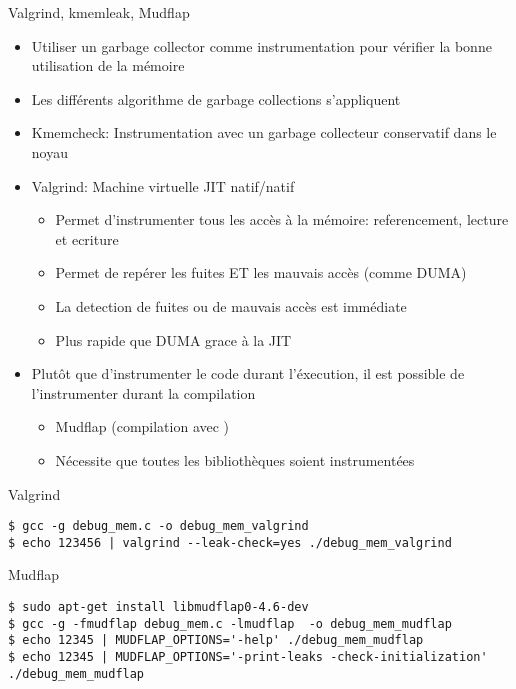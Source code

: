 \begin{frame}[fragile=singleslide]{Valgrind, kmemleak, Mudflap}
  \begin{itemize}
  \item  Utiliser  un  garbage  collector comme  instrumentation  pour
    vérifier la bonne utilisation de la mémoire
  \item Les différents algorithme de garbage collections s'appliquent
  \item   Kmemcheck:  Instrumentation   avec  un   garbage  collecteur
    conservatif dans le noyau
  \item Valgrind: Machine virtuelle JIT natif/natif
    \begin{itemize}
    \item  Permet   d'instrumenter  tous  les  accès   à  la  mémoire:
      referencement, lecture et ecriture
    \item Permet  de repérer  les fuites ET  les mauvais  accès (comme
      DUMA)
    \item La detection de fuites ou de mauvais accès est immédiate
    \item Plus rapide que DUMA grace à la JIT
    \end{itemize}
  \item Plutôt  que d'instrumenter le code durant  l'éxecution, il est
    possible de l'instrumenter durant la compilation
    \begin{itemize}
    \item Mudflap (compilation avec )
    \item Nécessite que toutes les bibliothèques soient instrumentées
    \end{itemize}
  \end{itemize}
\end{frame}

\begin{frame}[fragile=singleslide]{Valgrind}
  \begin{lstlisting}
$ gcc -g debug_mem.c -o debug_mem_valgrind
$ echo 123456 | valgrind --leak-check=yes ./debug_mem_valgrind
  \end{lstlisting}
\end{frame}

\begin{frame}[fragile=singleslide]{Mudflap}
  \begin{lstlisting}
$ sudo apt-get install libmudflap0-4.6-dev
$ gcc -g -fmudflap debug_mem.c -lmudflap  -o debug_mem_mudflap
$ echo 12345 | MUDFLAP_OPTIONS='-help' ./debug_mem_mudflap
$ echo 12345 | MUDFLAP_OPTIONS='-print-leaks -check-initialization' ./debug_mem_mudflap
  \end{lstlisting}
\end{frame}

